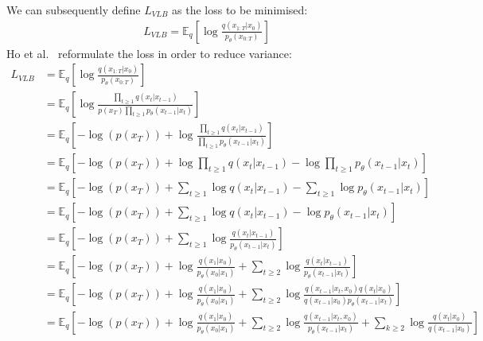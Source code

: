 \documentclass[twoside]{article}
\numberwithin{equation}{section}
\numberwithin{figure}{section}
\begin{document}
We can subsequently define $L_{VLB}$ as the loss to be minimised:
\begin{gather}
  L_{VLB} = \mathbb{E}_q \left[\log \frac{q\left(x_{1:T}|x_0\right)}{p_{\theta}\left(x_{0:T}\right)}\right] 
\end{gather}
Ho et al.~\cite{ho2020denoising} reformulate the loss in order to reduce variance:
\begin{align}
  L_{VLB} &= \mathbb{E}_q \left[\log \frac{q\left(x_{1:T}|x_0\right)}{p_{\theta}\left(x_{0:T}\right)}\right] \\
  &= \mathbb{E}_q \left[\log \frac{\prod_{t \geq 1} q\left(x_t | x_{t-1}\right)}{p \left(x_T\right) \prod_{t \geq 1} p_{\theta}\left(x_{t-1} | x_t\right)}\right] \\
  &= \mathbb{E}_q \left[-\log\left(p \left(x_T\right)\right) + \log \frac{\prod_{t \geq 1} q\left(x_t | x_{t-1}\right)}{\prod_{t \geq 1} p_{\theta}\left(x_{t-1} | x_t\right)}\right] \\
  &= \mathbb{E}_q \left[-\log\left(p \left(x_T\right)\right) + \log \prod_{t \geq 1} q\left(x_t | x_{t-1}\right) - \log \prod_{t \geq 1} p_{\theta}\left(x_{t-1} | x_t\right)\right] \\
  &= \mathbb{E}_q \left[-\log\left(p \left(x_T\right)\right) + \sum_{t \geq 1} \log q\left(x_t | x_{t-1}\right) - \sum_{t \geq 1} \log p_{\theta}\left(x_{t-1} | x_t\right)\right] \\
  &= \mathbb{E}_q \left[-\log\left(p \left(x_T\right)\right) + \sum_{t \geq 1} \log q\left(x_t | x_{t-1}\right) - \log p_{\theta}\left(x_{t-1} | x_t\right)\right] \\
  &= \mathbb{E}_q \left[-\log\left(p \left(x_T\right)\right) + \sum_{t \geq 1} \log \frac{q\left(x_t | x_{t-1}\right)}{p_{\theta}\left(x_{t-1} | x_t\right)}\right] \\
  &= \mathbb{E}_q \left[-\log\left(p \left(x_T\right)\right) + \log \frac{q\left(x_1 | x_0\right)}{p_{\theta}\left(x_0 | x_1\right)} + \sum_{t \geq 2} \log \frac{q\left(x_t | x_{t-1}\right)}{p_{\theta}\left(x_{t-1} | x_t\right)}\right] \\
  &= \mathbb{E}_q \left[-\log\left(p \left(x_T\right)\right) + \log \frac{q\left(x_1 | x_0\right)}{p_{\theta}\left(x_0 | x_1\right)} + \sum_{t \geq 2} \log \frac{q\left(x_{t-1} | x_t, x_0\right) q\left(x_t | x_0\right)}{{q\left(x_{t-1} | x_0\right)} p_{\theta}\left(x_{t-1} | x_t\right)}\right] \label{eq:conditionedq}\\
  &= \mathbb{E}_q \left[-\log\left(p \left(x_T\right)\right) + \log \frac{q\left(x_1 | x_0\right)}{p_{\theta}\left(x_0 | x_1\right)} + \sum_{t \geq 2} \log \frac{q\left(x_{t-1} | x_t, x_0\right)}{p_{\theta}\left(x_{t-1} | x_t\right)} + \sum_{k \geq 2} \log \frac{q\left(x_t | x_0\right)}{q\left(x_{t-1} | x_0\right)}\right] \\

\end{align}
\end{document}
